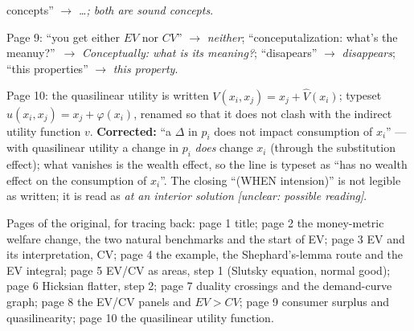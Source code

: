 \documentclass[11pt]{article}
\begin{document}
\begin{transcriptnotes}
        concepts'' $\to$ \emph{\dots; both are sound concepts}.
  \item Page 9: ``you get either $EV$ nor $CV$'' $\to$ \emph{neither};
        ``conceputalization: what's the meanuy?''\ $\to$ \emph{Conceptually: what
        is its meaning?}; ``disapears'' $\to$ \emph{disappears}; ``this
        properties'' $\to$ \emph{this property}.
  \item Page 10: the quasilinear utility is written $V(x_i,x_j)=x_j+\hat V(x_i)$;
        typeset $u(x_i,x_j)=x_j+\varphi(x_i)$, renamed so that it does not clash
        with the indirect utility function $v$. \textbf{Corrected:} ``a $\Delta$ in $p_i$ does not impact
        consumption of $x_i$'' --- with quasilinear utility a change in $p_i$
        \emph{does} change $x_i$ (through the substitution effect); what vanishes
        is the wealth effect, so the line is typeset as ``has no wealth effect on
        the consumption of $x_i$''. The closing ``(WHEN intension)'' is not
        legible as written; it is read as \emph{at an interior solution}
        \textit{[unclear: possible reading]}.
  \item Pages of the original, for tracing back: page 1 title; page 2 the
        money-metric welfare change, the two natural benchmarks and the start of
        EV; page 3 EV and its interpretation, CV; page 4 the example, the
        Shephard's-lemma route and the EV integral; page 5 EV/CV as areas,
        step 1 (Slutsky equation, normal good); page 6 Hicksian flatter, step 2;
        page 7 duality crossings and the demand-curve graph; page 8 the EV/CV
        panels and $EV>CV$; page 9 consumer surplus and quasilinearity; page 10
        the quasilinear utility function.
\end{transcriptnotes}
\end{document}
